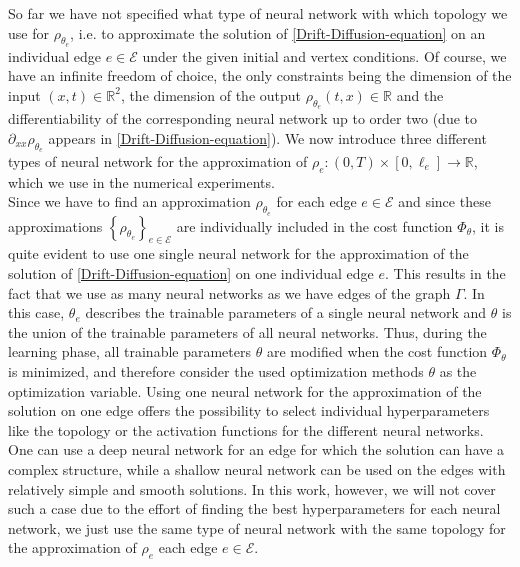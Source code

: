 So far we have not specified what type of neural network with which topology we use for $\rho_{\theta_e}$, i.e. to approximate the solution of \cref{Drift-Diffusion-equation} on an individual edge $e \in \mathcal{E}$ under the given initial and vertex conditions. Of course, we have an infinite freedom of choice, the only constraints being the dimension of the input $(x,t) \in \mathbb{R}^2$, the dimension of the output $\rho_{\theta_e}(t, x) \in \mathbb{R}$ and the differentiability of the corresponding neural network up to order two (due to $\partial_{xx} \rho_{\theta_e}$ appears in \cref{Drift-Diffusion-equation}). We now introduce three different types of neural network for the approximation of $\rho_e \colon (0, T) \times [0, \ell_e] \to \mathbb{R}$, which we use in the numerical experiments. \\
Since we have to find an approximation $\rho_{\theta_e}$ for each edge $e \in \mathcal{E}$ and since these approximations $\left\{ \rho_{\theta_e} \right\}_{e \in \mathcal{E}}$ are individually included in the cost function $\Phi_{\theta}$, it is quite evident to use one single neural network for the approximation of the solution of \cref{Drift-Diffusion-equation} on one individual edge $e$. This results in the fact that we use as many neural networks as we have edges of the graph $\Gamma$. In this case, $\theta_e$ describes the trainable parameters of a single neural network and $\theta$ is the union of the trainable parameters of all neural networks. Thus, during the learning phase, all trainable parameters $\theta$ are modified when the cost function $\Phi_{\theta}$ is minimized, and therefore consider the used optimization methods $\theta$ as the optimization variable. Using one neural network for the approximation of the solution on one edge offers the possibility to select individual hyperparameters like the topology or the activation functions for the different neural networks. One can use a deep neural network for an edge for which the solution can have a complex structure, while a shallow neural network can be used on the edges with relatively simple and smooth solutions. In this work, however, we will not cover such a case due to the effort of finding the best hyperparameters for each neural network, we just use the same type of neural network with the same topology for the approximation of $\rho_e$ each edge $e \in \mathcal{E}$. \\

